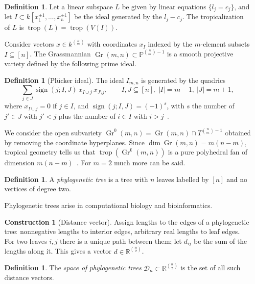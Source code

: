 \documentclass[11pt,a4paper]{article}
\numberwithin{equation}{section}
\theoremstyle{plain}
\theoremstyle{definition}
\newtheorem{definition}[theorem]{Definition}
\newtheorem{construction}[theorem]{Construction}
\theoremstyle{remark}
\newcommand{\R}{\mathbb{R}}
\DeclareMathOperator{\Gr}{Gr}
\DeclareMathOperator{\trop}{trop}
\begin{document}
\begin{definition}
Let a linear subspace $L$ be given by linear equations $\{l_j=c_j\}$, and let $I\subset k[x_1^{\pm1},\dots,x_n^{\pm1}]$ be the ideal generated by the $l_j-c_j$. The tropicalization of $L$ is $\trop(L)=\trop(V(I))$.
\end{definition}

Consider vectors $x\in k^{\binom nm}$ with coordinates $x_I$ indexed by the $m$-element subsets $I\subseteq[n]$. The Grassmannian $\Gr(m,n)\subset\mathbb P^{\binom nm-1}$ is a smooth projective variety defined by the following prime ideal.

\begin{definition}[Plücker ideal]
The ideal $I_{m,n}$ is generated by the quadrics
\[
\sum_{j\in J}\operatorname{sign}(j;I,J)\,x_{I\cup j}\,x_{J\setminus j},\qquad I,J\subseteq[n],\ |I|=m-1,\ |J|=m+1,
\]
where $x_{I\cup j}=0$ if $j\in I$, and $\operatorname{sign}(j;I,J)=(-1)^{s}$, with $s$ the number of $j'\in J$ with $j'<j$ plus the number of $i\in I$ with $i>j$~\cite[§4.3]{MS15}.
\end{definition}

We consider the open subvariety $\Gr^0(m,n)=\Gr(m,n)\cap T^{\binom nm-1}$ obtained by removing the coordinate hyperplanes. Since $\dim\Gr(m,n)=m(n-m)$, tropical geometry tells us that $\trop(\Gr^0(m,n))$ is a pure polyhedral fan of dimension $m(n-m)$~\cite{MS15}. For $m=2$ much more can be said.

\begin{definition}
A \emph{phylogenetic tree} is a tree with $n$ leaves labelled by $[n]$ and no vertices of degree two.
\end{definition}

Phylogenetic trees arise in computational biology and bioinformatics.

\begin{construction}[Distance vector]
Assign lengths to the edges of a phylogenetic tree: nonnegative lengths to interior edges, arbitrary real lengths to leaf edges. For two leaves $i,j$ there is a unique path between them; let $d_{ij}$ be the sum of the lengths along it. This gives a vector $d\in\R^{\binom n2}$.
\end{construction}

\begin{definition}
The \emph{space of phylogenetic trees} $\mathcal D_n\subset\R^{\binom n2}$ is the set of all such distance vectors.
\end{definition}
\end{document}
